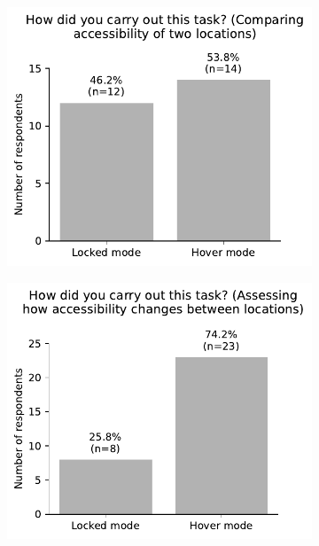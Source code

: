\begin{appendices}
\begin{figure}[H]
	\begin{subfigure}[b]{0.5\textwidth}
		\includegraphics[width=\textwidth]{visual/figures/survey/5.pdf}
	\end{subfigure}%
	\begin{subfigure}[b]{0.5\textwidth}
		\includegraphics[width=\textwidth]{visual/figures/survey/6.pdf}
	\end{subfigure}
	\newline
\end{figure}


\end{appendices}
